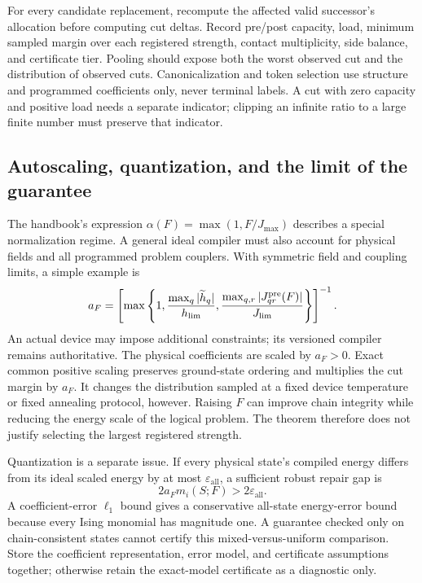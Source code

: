 For every candidate replacement, recompute the affected valid successor's allocation before computing cut deltas. Record pre/post capacity, load, minimum sampled margin over each registered strength, contact multiplicity, side balance, and certificate tier. Pooling should expose both the worst observed cut and the distribution of observed cuts. Canonicalization and token selection use structure and programmed coefficients only, never terminal labels. A cut with zero capacity and positive load needs a separate indicator; clipping an infinite ratio to a large finite number must preserve that indicator.

\subsection{Autoscaling, quantization, and the limit of the guarantee}
\label{theory:limits}

The handbook's expression $\alpha(F)=\max(1,F/J_{\max})$ describes a special normalization regime. A general ideal compiler must also account for physical fields and all programmed problem couplers. With symmetric field and coupling limits, a simple example is
\[
 a_F=\left[\max\left\{1,
       \frac{\max_q|\widetilde h_q|}{h_{\rm lim}},
       \frac{\max_{q,r}|J^{\mathrm{pre}}_{qr}(F)|}{J_{\rm lim}}
       \right\}\right]^{-1}.
\]
An actual device may impose additional constraints; its versioned compiler remains authoritative. The physical coefficients are scaled by $a_F>0$. Exact common positive scaling preserves ground-state ordering and multiplies the cut margin by $a_F$. It changes the distribution sampled at a fixed device temperature or fixed annealing protocol, however. Raising $F$ can improve chain integrity while reducing the energy scale of the logical problem. The theorem therefore does not justify selecting the largest registered strength.

Quantization is a separate issue. If every physical state's compiled energy differs from its ideal scaled energy by at most $\varepsilon_{\mathrm{all}}$, a sufficient robust repair gap is
\[
 2a_Fm_i(S;F)>2\varepsilon_{\mathrm{all}}.
\]
A coefficient-error $\ell_1$ bound gives a conservative all-state energy-error bound because every Ising monomial has magnitude one. A guarantee checked only on chain-consistent states cannot certify this mixed-versus-uniform comparison. Store the coefficient representation, error model, and certificate assumptions together; otherwise retain the exact-model certificate as a diagnostic only.

